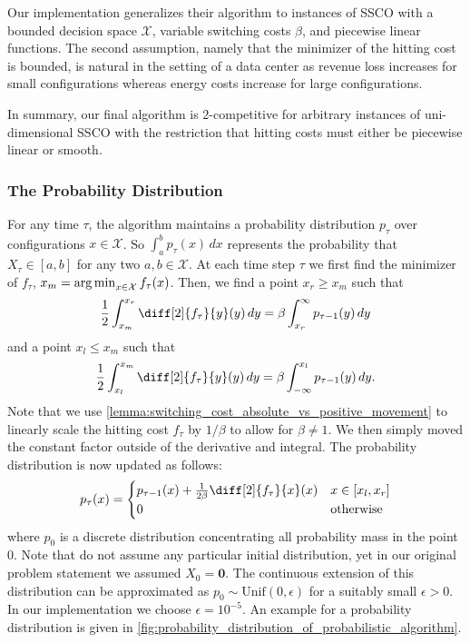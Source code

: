 Our implementation generalizes their algorithm to instances of SSCO with a bounded decision space $\mathcal{X}$, variable switching costs $\beta$, and piecewise linear functions. The second assumption, namely that the minimizer of the hitting cost is bounded, is natural in the setting of a data center as revenue loss increases for small configurations whereas energy costs increase for large configurations.

In summary, our final algorithm is $2$-competitive for arbitrary instances of uni-dimensional SSCO with the restriction that hitting costs must either be piecewise linear or smooth.

\subsubsection{The Probability Distribution}

For any time $\tau$, the algorithm maintains a probability distribution $p_{\tau}$ over configurations $x \in \mathcal{X}$. So $\int_a^b p_{\tau}(x) \,dx$ represents the probability that $X_{\tau} \in [a,b]$ for any two $a, b \in \mathcal{X}$. At each time step $\tau$ we first find the minimizer of $f_{\tau}$, $x_m = \operatorname*{arg\,min}_{x \in \mathcal{X}} f_{\tau}(x)$. Then, we find a point $x_r \geq x_m$ such that \begin{align}\label{eq:ud:probabilistic:right}
    \frac{1}{2} \int_{x_m}^{x_r} \diff[2]{f_{\tau}}{y}(y) \,dy = \beta \int_{x_r}^{\infty} p_{\tau-1}(y) \,dy
\end{align} and a point $x_l \leq x_m$ such that \begin{align}\label{eq:ud:probabilistic:left}
    \frac{1}{2} \int_{x_l}^{x_m} \diff[2]{f_{\tau}}{y}(y) \,dy = \beta \int_{-\infty}^{x_l} p_{\tau-1}(y) \,dy.
\end{align} Note that we use \autoref{lemma:switching_cost_absolute_vs_positive_movement} to linearly scale the hitting cost $f_{\tau}$ by $1 / \beta$ to allow for $\beta \neq 1$. We then simply moved the constant factor outside of the derivative and integral. The probability distribution is now updated as follows: \begin{align}\label{eq:ud:probabilistic:update}
    p_{\tau}(x) = \begin{cases}
        p_{\tau-1}(x) + \frac{1}{2 \beta} \diff[2]{f_{\tau}}{x}(x) & x \in [x_l,x_r] \\
        0 & \text{otherwise}
    \end{cases}
\end{align} where $p_0$ is a discrete distribution concentrating all probability mass in the point $0$. Note that \citeauthor*{Bansal2015} do not assume any particular initial distribution, yet in our original problem statement we assumed $X_0 = \mathbf{0}$. The continuous extension of this distribution can be approximated as $p_0 \sim \text{Unif}(0, \epsilon)$ for a suitably small $\epsilon > 0$. In our implementation we choose $\epsilon = 10^{-5}$. An example for a probability distribution is given in \autoref{fig:probability_distribution_of_probabilistic_algorithm}.

